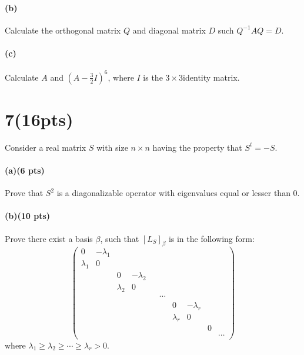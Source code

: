 \documentclass{article}
\begin{document}
\paragraph{(b)} Calculate the orthogonal matrix $Q$ and diagonal matrix $D$ such $Q^{-1}AQ=D$. 
\paragraph{(c)} Calculate $A$ and $(A-\frac{3}{2}I)^6$, where $I$ is the $3\times 3$identity matrix.
\section*{7(16pts)}
Consider a real matrix $S$ with size $n\times n$ having the property that $S^t=-S$.
\paragraph{(a)(6 pts)}
Prove that $S^2$ is a diagonalizable operator with eigenvalues equal or lesser than $0$.
\paragraph{(b)(10 pts)}
Prove there exist a basis $\beta$, such that $[L_S]_\beta$ is in the following form:
$$\begin{pmatrix}
    0 & -\lambda_1\\ \lambda_1 & 0 \\ & & 0 & -\lambda_2\\ & & \lambda_2 & 0\\ & & & & & \cdots\\ & & & & & & 0 & -\lambda_r\\ & & & & & & \lambda_r & 0\\ & & & & & & & & 0\\ & & & & & & & & & \cdots
\end{pmatrix}$$
where $\lambda_1\ge \lambda_2 \ge \cdots \ge \lambda_r>0$.
\end{document}
